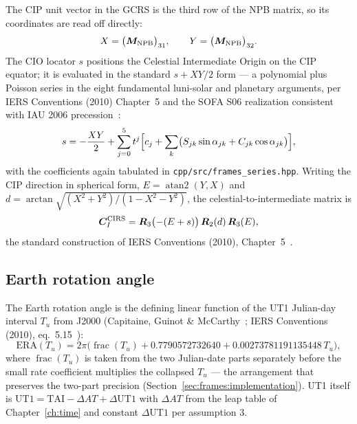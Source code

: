 The CIP unit vector in the GCRS is the third row of the NPB matrix, so its
coordinates are read off directly:
\begin{equation}
  X = \bigl(\bm{M}_{\mathrm{NPB}}\bigr)_{31},
  \qquad
  Y = \bigl(\bm{M}_{\mathrm{NPB}}\bigr)_{32}.
  \label{eq:frames:xy}
\end{equation}
The CIO locator $s$ positions the Celestial Intermediate Origin on the
CIP equator; it is evaluated in the standard $s + XY/2$ form --- a
polynomial plus Poisson series in the eight fundamental luni-solar and
planetary arguments, per IERS Conventions (2010) Chapter~5 and the SOFA
S06 realization consistent with IAU 2006 precession~\cite{iers2010,
wallace2006}:
\begin{equation}
  s = -\frac{XY}{2}
      + \sum_{j=0}^{5} t^{j} \Bigl[ c_j + \sum_{k}
        \bigl( S_{jk} \sin\alpha_{jk} + C_{jk} \cos\alpha_{jk} \bigr)
        \Bigr],
  \label{eq:frames:s06}
\end{equation}
with the coefficients again tabulated in
\texttt{cpp/src/frames\_series.hpp}. Writing the CIP direction in
spherical form, $E = \operatorname{atan2}(Y, X)$ and
$d = \arctan\sqrt{(X^2 + Y^2)/(1 - X^2 - Y^2)}$, the
celestial-to-intermediate matrix is
\begin{equation}
  \bm{C}_{I}^{\mathrm{CIRS}} = \bm{R}_3\bigl(-(E + s)\bigr)\,
    \bm{R}_2(d)\, \bm{R}_3(E),
  \label{eq:frames:c2i}
\end{equation}
the standard construction of IERS Conventions (2010),
Chapter~5~\cite{iers2010}.

\subsection{Earth rotation angle}

The Earth rotation angle is the defining linear function of the UT1
Julian-day interval $T_u$ from J2000 (Capitaine, Guinot \&
McCarthy~\cite{capitaine2000}; IERS Conventions (2010),
eq.~5.15~\cite{iers2010}):
\begin{equation}
  \mathrm{ERA}(T_u) = 2\pi \bigl( \operatorname{frac}(T_u)
    + 0.7790572732640 + 0.00273781191135448\, T_u \bigr) ,
  \label{eq:frames:era}
\end{equation}
where $\operatorname{frac}(T_u)$ is taken from the two Julian-date parts
separately before the small rate coefficient multiplies the collapsed
$T_u$ --- the arrangement that preserves the two-part precision
(Section~\ref{sec:frames:implementation}). UT1 itself is
$\mathrm{UT1} = \mathrm{TAI} - \Delta AT + \Delta\mathrm{UT1}$ with
$\Delta AT$ from the leap table of Chapter~\ref{ch:time} and constant
$\Delta\mathrm{UT1}$ per assumption 3.

